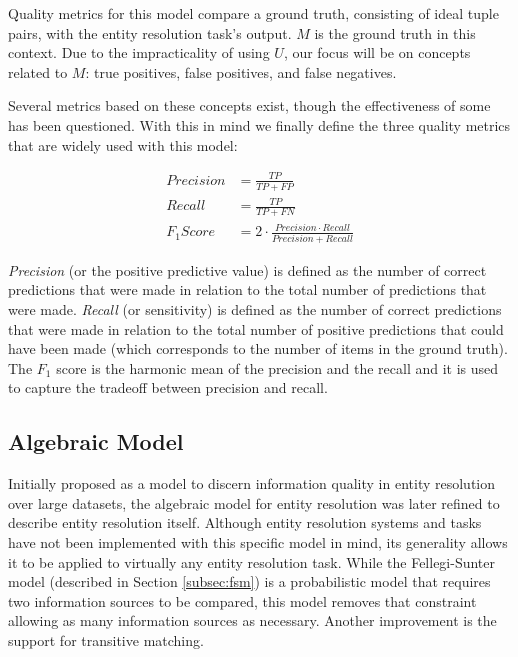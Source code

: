 \documentclass[lettersize,journal]{IEEEtran}
\begin{document}
    Quality metrics for this model compare a ground truth, consisting of ideal
    tuple pairs, with the entity resolution task's output.
    $M$ is the ground truth in this context.
    Due to the impracticality of using $U$, our focus will be on concepts
    related to $M$: true positives, false positives, and false negatives.
    
    Several metrics based on these concepts exist, though the effectiveness of
    some has been questioned\cite{Goga2015}.
    With this in mind we finally define the three quality metrics that are
    widely used with this model:

    \begin{align}
    Precision&=\frac{TP}{TP+FP} \\
    Recall&=\frac{TP}{TP+FN} \\
    F_1 Score&=2 \cdot \frac{Precision \cdot Recall}{Precision+Recall}
    \end{align}

    \textit{Precision} (or the positive predictive value) is defined as the
    number of correct predictions that were made in relation to the total number
    of predictions that were made.
    \textit{Recall} (or sensitivity) is defined as the number of correct
    predictions that were made in relation to the total number of positive
    predictions that could have been made (which corresponds to the number of
    items in the ground truth).
    The \textit{$F_1$} score is the harmonic mean of the precision and the
    recall and it is used to capture the tradeoff between precision and
    recall\cite{hitesh2012}.

    \subsection[algebraic]{Algebraic Model}\label{subsec:algebraic}

    Initially proposed as a model to discern information quality in entity
    resolution over large datasets\cite{tal2007algebraic}, the algebraic model
    for entity resolution was later refined to describe entity resolution
    itself\cite{Tal11}.
    Although entity resolution systems and tasks have not been implemented with
    this specific model in mind, its generality allows it to be applied to
    virtually any entity resolution task.
    While the Fellegi-Sunter model (described in Section \ref{subsec:fsm}) is a probabilistic model 
    that requires two information sources to be compared, this model removes
    that constraint allowing as many information sources as necessary.
    Another improvement is the support for transitive matching.
    
\end{document}
